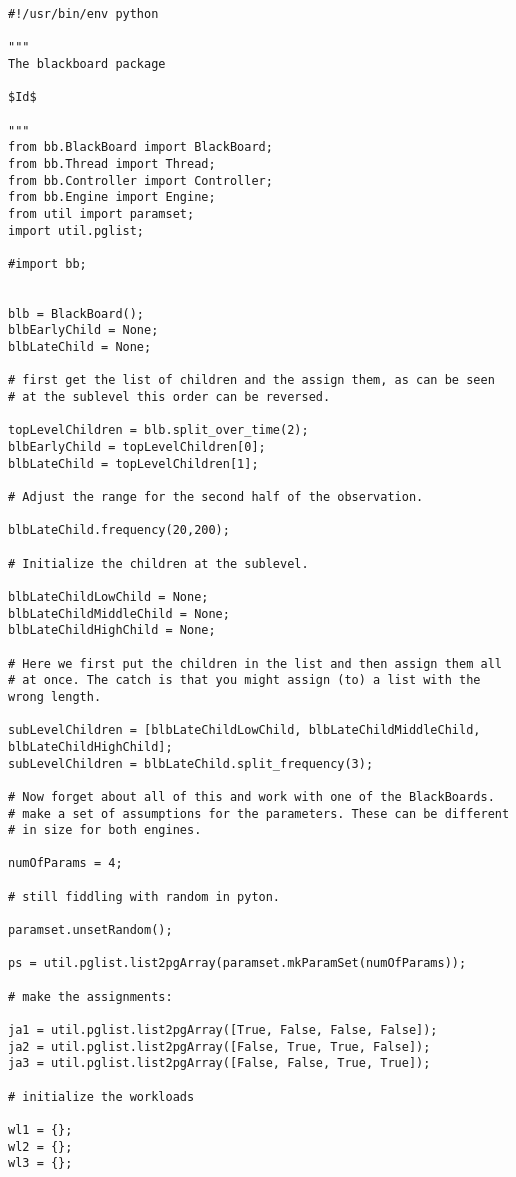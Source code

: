 \documentclass[]{lofar}
\begin{document}
\begin{Verbatim}[]
#!/usr/bin/env python

"""
The blackboard package

$Id$

"""
from bb.BlackBoard import BlackBoard;
from bb.Thread import Thread;
from bb.Controller import Controller;
from bb.Engine import Engine;
from util import paramset;
import util.pglist;

#import bb;


blb = BlackBoard();
blbEarlyChild = None;
blbLateChild = None;

# first get the list of children and the assign them, as can be seen
# at the sublevel this order can be reversed.

topLevelChildren = blb.split_over_time(2);
blbEarlyChild = topLevelChildren[0];
blbLateChild = topLevelChildren[1];

# Adjust the range for the second half of the observation.

blbLateChild.frequency(20,200);

# Initialize the children at the sublevel.

blbLateChildLowChild = None;
blbLateChildMiddleChild = None;
blbLateChildHighChild = None;

# Here we first put the children in the list and then assign them all
# at once. The catch is that you might assign (to) a list with the wrong length.

subLevelChildren = [blbLateChildLowChild, blbLateChildMiddleChild, blbLateChildHighChild];
subLevelChildren = blbLateChild.split_frequency(3);

# Now forget about all of this and work with one of the BlackBoards.
# make a set of assumptions for the parameters. These can be different
# in size for both engines.

numOfParams = 4;

# still fiddling with random in pyton.

paramset.unsetRandom();

ps = util.pglist.list2pgArray(paramset.mkParamSet(numOfParams));

# make the assignments:

ja1 = util.pglist.list2pgArray([True, False, False, False]);
ja2 = util.pglist.list2pgArray([False, True, True, False]);
ja3 = util.pglist.list2pgArray([False, False, True, True]);

# initialize the workloads

wl1 = {};
wl2 = {};
wl3 = {};


\end{Verbatim}
\end{document}
